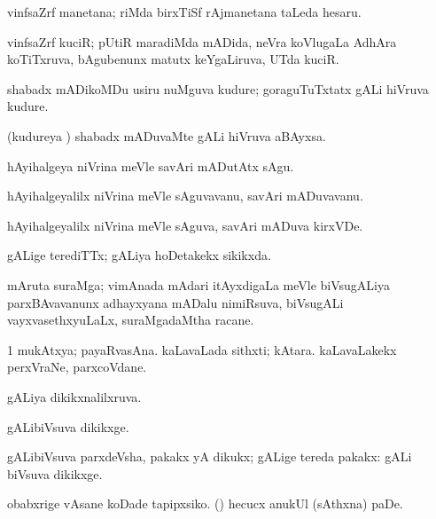 {{{{{{\noindent
\gl{\pagu}
\bmng
{} vinfsaZrf manetana;  riMda birxTiSf rAjmanetana taLeda hesaru. 
\emng
\eentry

\bentry
{}
 \gl{\nA}\bmng
vinfsaZrf kuciR; pUtiR maradiMda mADida, neVra koVlugaLa AdhAra koTiTxruva, bAgubenunx matutx keYgaLiruva, UTda kuciR. 
\emng
\eentry

\bentry
{}
  \gl{\nA}\bmng
shabadx mADikoMDu usiru nuMguva kudure; goraguTuTxtatx gALi hiVruva kudure. 
\emng
\eentry

\bentry
{}
  \gl{\nA}\bmng
(kudureya \vi) shabadx mADuvaMte gALi hiVruva aBAyxsa. 
\emng
\eentry

\bentry
{}
  \gl{\akirx}\bmng
hAyihalgeya niVrina meVle savAri mADutAtx sAgu. 
\emng
\eentry

\bentry
{}
  \gl{\nA}\bmng
hAyihalgeyalilx niVrina meVle sAguvavanu, savAri mADuvavanu. 
\emng
\eentry

\bentry
{}
  \gl{\nA}\bmng
hAyihalgeyalilx niVrina meVle sAguva, savAri mADuva kirxVDe. 
\emng
\eentry

\bentry
{}
  \gl{\gu}\bmng
gALige terediTTx; gALiya hoDetakekx sikikxda. 
\emng
\eentry

\bentry
{}
  \gl{\nA}\bmng
mAruta suraMga; vimAnada mAdari itAyxdigaLa meVle biVsugALiya parxBAvavanunx adhayxyana mADalu nimiRsuva, biVsugALi vayxvasethxyuLaLx, suraMgadaMtha racane. 
\emng
\eentry

\bentry
{}
  \gl{\nA}\bmng
\bnum
\num{1} mukAtxya; payaRvasAna. 
\banum
{} kaLavaLada sithxti; kAtara. 
 kaLavaLakekx perxVraNe, parxcoVdane. 
\eanum
\numie
\enum
\emng
\eentry

\bentry
{} 
\gl{\gu}
\expl{}
\bmng
gALiya dikikxnalilxruva. 
\emng
\eentry

\bentry
{}
\gl{\kirxvi}
\bmng
gALibiVsuva dikikxge. 
\emng
\eentry

\bentry
{}
\gl{\nA}
\bmng
gALibiVsuva parxdeVsha, pakakx yA dikukx; gALige tereda pakakx:  gALi biVsuva dikikxge. 
\emng

\noindent
\gl{\pagu}
\expl{}
\bmng
{} 
\banum
{} obabxrige vAsane koDade tapipxsiko. 
 (\rUpa) hecucx anukUl (sAthxna) paDe. 
\eanum
\emng
\eentry

}}}}}}
